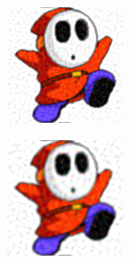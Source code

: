 \documentclass[11pt]{report}
\theoremstyle{plain}
\theoremstyle{remark}
\begin{document}
\pagebreak
{}
\begin{figure}
	\centering
	\begin{subfigure}[b]{0.24\textwidth}
		\centering
		\includegraphics[width=\textwidth]{plaatjes/shyguy_fourier_0_1.png}
	\end{subfigure}
	\begin{subfigure}[b]{0.24\textwidth}
		\centering
		\includegraphics[width=\textwidth]{plaatjes/shyguy_fourier_0_05.png}

\end{subfigure}
\end{figure}
\end{document}
